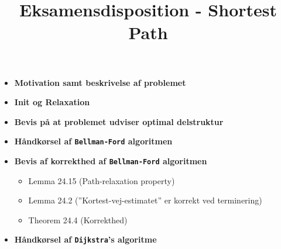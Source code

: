 
\title{Eksamensdisposition - Shortest Path}

\maketitle



\begin{itemize}
\item \textbf{Motivation samt beskrivelse af problemet}

\item \textbf{Init og Relaxation}

\item \textbf{Bevis på at problemet udviser optimal delstruktur}

\item \textbf{Håndkørsel af \texttt{Bellman-Ford} algoritmen}

\item \textbf{Bevis af korrekthed af \texttt{Bellman-Ford} algoritmen}
\begin{itemize}
	\item Lemma 24.15 (Path-relaxation property)
	\item Lemma 24.2 (''Kortest-vej-estimatet'' er korrekt ved terminering)
	\item Theorem 24.4 (Korrekthed)
\end{itemize}

\item \textbf{Håndkørsel af \texttt{Dijkstra}'s algoritme}


\end{itemize}

\newpage
